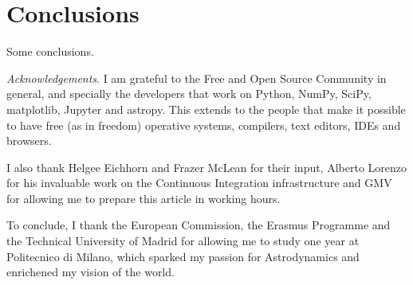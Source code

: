 \section{Conclusions}

Some conclusions.

\footnotesize{\textit{Acknowledgements}. I am grateful to the Free and Open Source Community in general, and specially the developers that work on Python, NumPy, SciPy, matplotlib, Jupyter and astropy. This extends to the people that make it possible to have free (as in freedom) operative systems, compilers, text editors, IDEs and browsers.

I also thank Helgee Eichhorn and Frazer McLean for their input, Alberto Lorenzo for his invaluable work on the Continuous Integration infrastructure and GMV for allowing me to prepare this article in working hours.

To conclude, I thank the European Commission, the Erasmus Programme and the Technical University of Madrid for allowing me to study one year at Politecnico di Milano, which sparked my passion for Astrodynamics and enrichened my vision of the world.
}